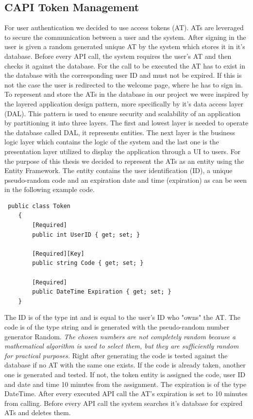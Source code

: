 \subsection{CAPI Token Management}
For user authentication we decided to use access tokens (AT). ATs are leveraged to secure the communication between a user and the system. After signing in the user is given a random generated unique AT by the system which stores it in it's database. Before every API call, the system requires the user's AT and then checks it against the database. For the call to be executed the AT has to exist in the database with the corresponding user ID and must not be expired. If this is not the case the user is redirected to the welcome page, where he has to sign in. To represent and store the ATs in the database in our project we were inspired by the layered application design pattern, more specifically by it's data access layer (DAL). This pattern is used to ensure security and scalability of an application by partitioning it into three layers. The first and lowest layer is needed to operate the database called DAL, it represents entities. The next layer is the business logic layer which contains the logic of the system and the last one is the presentation layer utilized to display the application through a UI to users. For the purpose of this thesis we decided to represent the ATs as an entity using the Entity Framework. The entity contains the user identification (ID), a unique pseudo-random code and an expiration date and time (expiration) as can be seen in the following example code. 
\lstset{style=sharpc}
\begin{lstlisting}
 public class Token
    {
        [Required]
        public int UserID { get; set; }

        [Required][Key]
        public string Code { get; set; }

        [Required]
        public DateTime Expiration { get; set; }
    }
\end{lstlisting}
The ID is of the type int and is equal to the user's ID who "owns" the AT. The code is of the type string and is generated with the pseudo-random number generator Random. \textit{The chosen numbers are not completely random because a mathematical algorithm is used to select them, but they are sufficiently random for practical purposes.}\cite{msdn_documentation_system_random} Right after generating the code is tested against the database if no AT with the same one exists. If the code is already taken, another one is generated and tested. If not, the token entity is assigned the code, user ID and date and time 10 minutes from the assignment. The expiration is of the type DateTime. After every executed API call the AT's expiration is set to 10 minutes from calling. 
Before every API call the system searches it's database for expired ATs and deletes them. 

